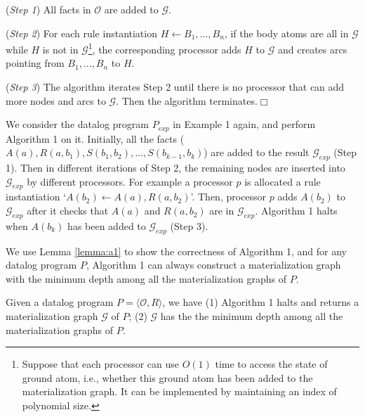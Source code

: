 \documentclass{article}
\begin{document}
(\emph{Step 1}) All facts in $\mathcal{O}$ are added to $\mathcal{G}$.

(\emph{Step 2}) For each rule instantiation $H\leftarrow B_1,...,B_n$, if the body atoms are all in $\mathcal{G}$ while $H$ is not in $\mathcal{G}$\footnote{Suppose that each processor can use $O(1)$ time to access the state of ground atom, i.e., whether this ground atom has been added to the materialization graph. It can be implemented by maintaining an
index of polynomial size.},
the corresponding processor adds $H$ to $\mathcal{G}$ and creates arcs pointing from $B_1,...,B_n$ to $H$.

(\emph{Step 3}) The algorithm iterates Step 2 until there is no processor that can add more nodes and arcs to $\mathcal{G}$.
Then the algorithm terminates.\hfill$\Box$\\

\begin{example}
We consider the datalog program $P_{exp}$ in Example 1 again, and perform Algorithm 1 on it. Initially, all the facts
($A(a),R(a,b_1),S(b_1,b_2),...,S(b_{k-1},b_{k})$) are added to the result $\mathcal{G}_{exp}$ (Step 1). Then in different iterations of Step 2, the remaining nodes are inserted into
$\mathcal{G}_{exp}$ by different processors. For example a processor $p$ is allocated a rule instantiation `$A(b_2)\leftarrow A(a),R(a,b_2)$'. Then, processor $p$ adds $A(b_2)$ to $\mathcal{G}_{exp}$ after it checks that $A(a)$ and $R(a,b_2)$ are in $\mathcal{G}_{exp}$. Algorithm 1 halts when $A(b_k)$ has been added to $\mathcal{G}_{exp}$ (Step 3).
\end{example}

We use Lemma \ref{lemma:a1} to show the correctness of Algorithm 1, and for any datalog program $P$, Algorithm 1 can always construct a materialization graph with the minimum depth among all the materialization graphs of $P$.

\begin{lemma}\label{lemma:a1}
Given a datalog program $P=\langle\mathcal{O}, R\rangle$, we have (1) Algorithm 1 halts and returns a materialization graph $\mathcal{G}$ of $P$; (2) $\mathcal{G}$ has the the minimum depth among all the materialization graphs of $P$.
\end{lemma}
\end{document}

